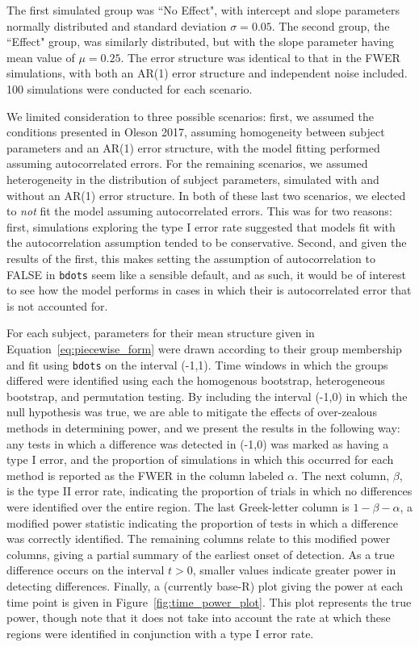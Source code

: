 \documentclass{article}
\newcommand{\xt}{\texttt}
\begin{document}
The first simulated group was ``No Effect", with intercept and slope parameters normally distributed and standard deviation $\sigma = 0.05$. The second group, the ``Effect" group, was similarly distributed, but with the slope parameter having mean value of $\mu = 0.25$. The error structure was identical to that in the FWER simulations, with both an AR(1) error structure and independent noise included. 100 simulations were conducted for each scenario. 

We limited consideration to three possible scenarios: first, we assumed the conditions presented in Oleson 2017, assuming homogeneity between subject parameters and an AR(1) error structure, with the model fitting performed assuming autocorrelated errors. For the remaining scenarios, we assumed heterogeneity in the distribution of subject parameters, simulated with and without an AR(1) error structure. In both of these last two scenarios, we elected to \textit{not} fit the model assuming autocorrelated errors. This was for two reasons: first, simulations exploring the type I error rate suggested that models fit with the autocorrelation assumption tended to be conservative. Second, and given the results of the first, this makes setting the assumption of autocorrelation to FALSE in \xt{bdots} seem like a sensible default, and as such, it would be of interest to see how the model performs in cases in which their is autocorrelated error that is not accounted for.

For each subject, parameters for their mean structure given in Equation~\ref{eq:piecewise_form} were drawn according to their group membership and fit using \xt{bdots} on the interval (-1,1). Time windows in which the groups differed were identified using each the homogenous bootstrap, heterogeneous bootstrap, and permutation testing. By including the interval (-1,0) in which the null hypothesis was true, we are able to mitigate the effects of over-zealous methods in determining power, and we present the results in the following way: any tests in which a difference was detected in (-1,0) was marked as having a type I error, and the proportion of simulations in which this occurred for each method is reported as the FWER in the column labeled $\alpha$. The next column, $\beta$, is the type II error rate, indicating the proportion of trials in which no differences were identified over the entire region. The last Greek-letter column is $1 - \beta - \alpha$, a modified power statistic indicating the proportion of tests in which a difference was correctly identified. The remaining columns relate to this modified power columns, giving a partial summary of the earliest onset of detection. As a true difference occurs on the interval $t > 0$, smaller values indicate greater power in detecting differences. Finally, a (currently base-R) plot giving the power at each time point is given in Figure~\ref{fig:time_power_plot}. This plot represents the true power, though note that it does not take into account the rate at which these regions were identified in conjunction with a type I error rate.
\end{document}
